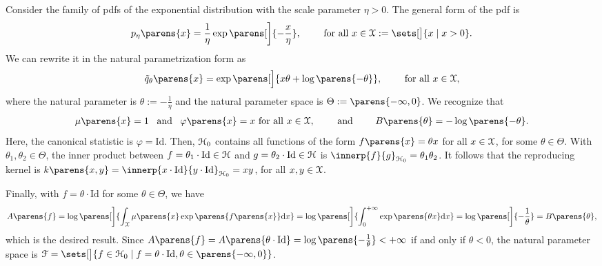 
\begin{example}
	Consider the family of pdfs of the exponential distribution with the scale parameter $\eta > 0$. The general form of the pdf is 
	\begin{align*}
		p_{\eta} \parens{x} = \frac{1}{\eta} \exp \parens[\bigg]{-\frac{x}{\eta}}, \qquad \text{ for all } x \in \calX := \sets[\big]{x \mid x > 0}. 
	\end{align*}
	We can rewrite it in the natural parametrization form as 
	\begin{align*}
		\tilde{q}_{\theta} \parens{x} = \exp \parens[\Big]{x \theta + \log \parens{-\theta}}, \qquad \text{ for all } x \in \calX, 
	\end{align*}
	where the natural parameter is $\theta := - \frac{1}{\eta}$ and the natural parameter space is $\Theta := \parens{-\infty, 0}$. We recognize that 
	\begin{align*}
		\mu \parens{x} = 1 \enspace \text{ and } \enspace \varphi \parens{x} = x \text{ for all } x \in \calX, \qquad \text{ and } \qquad B \parens{\theta} = - \log \parens{-\theta}.  
	\end{align*}
	Here, the canonical statistic is $\varphi = \mathrm{Id}$. Then, $\mathcal{H}_0$ contains all functions of the form $f \parens{x} = \theta x$ for all $x \in \mathcal{X}$, for some $\theta \in \Theta$. With $\theta_1, \theta_2 \in \Theta$, the inner product between $f = \theta_1 \cdot \mathrm{Id} \in \mathcal{H}$ and $g = \theta_2 \cdot \mathrm{Id} \in \mathcal{H}$ is $\innerp{f}{g}_{\calH_0} = \theta_1 \theta_2$. It follows that the reproducing kernel is $k \parens{x, y} = \innerp{x \cdot \mathrm{Id}}{y \cdot \mathrm{Id}}_{\calH_0} = x y$, for all $x, y \in \mathcal{X}$. 
	
	Finally, with $f = \theta \cdot \mathrm{Id}$ for some $\theta \in \Theta$, we have 
	\begin{align*}
		A \parens{f} = \log \parens[\bigg]{\int_{\calX} \mu \parens{x} \exp \parens{f \parens{x}} \diff x} 
		= \log \parens[\bigg]{\int_{0}^{+\infty} \exp \parens{\theta x} \diff x} = \log \parens[\bigg]{-\frac{1}{\theta}} = B \parens{\theta}, 
	\end{align*}
	which is the desired result. Since $A \parens{f} = A \parens{\theta \cdot \mathrm{Id}} = \log \parens{-\frac{1}{\theta}} < + \infty$ if and only if $\theta < 0$, the natural parameter space is $\calF = \sets[\big]{f \in \calH_0 \mid f = \theta \cdot \mathrm{Id}, \theta \in \parens{-\infty, 0} }$. 
\end{example}


